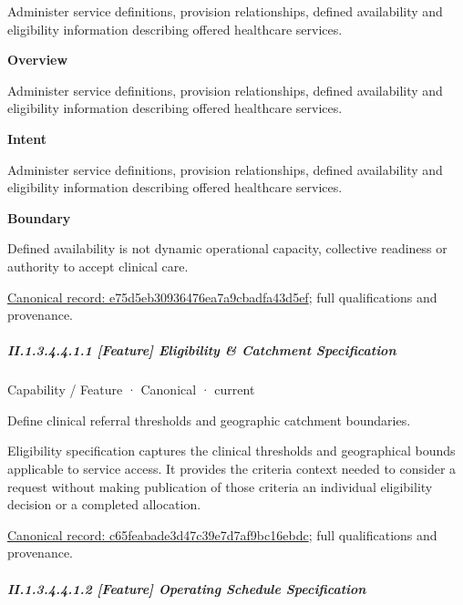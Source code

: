 Administer service definitions, provision relationships, defined availability and eligibility information describing offered healthcare services.



\textbf{Overview}



Administer service definitions, provision relationships, defined availability and eligibility information describing offered healthcare services.



\textbf{Intent}



Administer service definitions, provision relationships, defined availability and eligibility information describing offered healthcare services.



\textbf{Boundary}



Defined availability is not dynamic operational capacity, collective readiness or authority to accept clinical care.


{\footnotesize \href{../../../../../../../continuum/strategy/capability/e75d5eb30936476ea7a9cbadfa43d5ef.md}{Canonical record: e75d5eb30936476ea7a9cbadfa43d5ef}; full qualifications and provenance.}\par
\subparagraph*{II.1.3.4.4.1.1 [Feature] Eligibility \& Catchment Specification}
\label{navigation:II.1.3.4.4.1.1}

\label{element:c65feabade3d47c39e7d7af9bc16ebdc}
{\small Capability / Feature · Canonical · current}\par

Define clinical referral thresholds and geographic catchment boundaries.



Eligibility specification captures the clinical thresholds and geographical bounds applicable to service access. It provides the criteria context needed to consider a request without making publication of those criteria an individual eligibility decision or a completed allocation.


{\footnotesize \href{../../../../../../../continuum/strategy/capability/feature/c65feabade3d47c39e7d7af9bc16ebdc.md}{Canonical record: c65feabade3d47c39e7d7af9bc16ebdc}; full qualifications and provenance.}\par
\subparagraph*{II.1.3.4.4.1.2 [Feature] Operating Schedule Specification}
\label{navigation:II.1.3.4.4.1.2}

